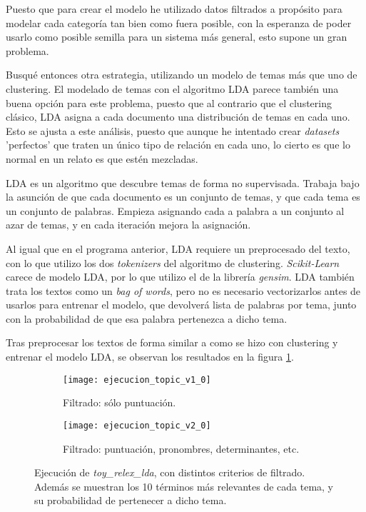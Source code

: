 \documentclass{pre-tfg}
\begin{document}
Puesto que para crear el modelo he utilizado datos filtrados a propósito para modelar cada categoría tan bien como fuera posible, con la esperanza de poder usarlo como posible semilla para un sistema más general, esto supone un gran problema.

Busqué entonces otra estrategia, utilizando un modelo de temas más que uno de clustering. El modelado de temas con el algoritmo LDA parece también una buena opción para este problema, puesto que al contrario que el clustering clásico, LDA asigna a cada documento una distribución de temas en cada uno. Esto se ajusta a este análisis, puesto que aunque he intentado crear \textit{datasets} 'perfectos' que traten un único tipo de relación en cada uno, lo cierto es que lo normal en un relato es que estén mezcladas.

LDA es un algoritmo que descubre temas de forma no supervisada. Trabaja bajo la asunción de que cada documento es un conjunto de temas, y que cada tema es un conjunto de palabras. Empieza asignando cada a palabra a un conjunto al azar de temas, y en cada iteración mejora la asignación. 

Al igual que en el programa anterior, LDA requiere un preprocesado del texto, con lo que utilizo los dos \textit{tokenizers} del algoritmo de clustering. \textit{Scikit-Learn} carece de modelo LDA, por lo que utilizo el de la librería \textit{gensim}. LDA también trata los textos como un \textit{bag of words}, pero no es necesario vectorizarlos antes de usarlos para entrenar el modelo, que devolverá  lista de palabras por tema, junto con la probabilidad de que esa palabra pertenezca a dicho tema.

Tras preprocesar los textos de forma similar a como se hizo con clustering y entrenar el modelo LDA, se observan los resultados en la figura \ref{fig:topicresult1}.

\begin{figure}
	\begin{subfigure}{\textwidth}
		\hspace{-1cm}
		\texttt{[image: ejecucion\_topic\_v1\_0]}
		\caption{Filtrado: sólo puntuación.}
		\label{fig:topicresult1}
	
	\end{subfigure}
	\begin{subfigure}{\textwidth}
		\hspace{-1cm}
		\texttt{[image: ejecucion\_topic\_v2\_0]}
		\caption{Filtrado: puntuación, pronombres, determinantes, etc.}
		\label{fig:topicresult2}
	\end{subfigure}

	\caption{Ejecución de \textit{toy\_relex\_lda}, con distintos criterios de filtrado. Además se muestran los 10 términos más relevantes de cada tema, y su probabilidad de pertenecer a dicho tema.}

\end{figure}
\end{document}
